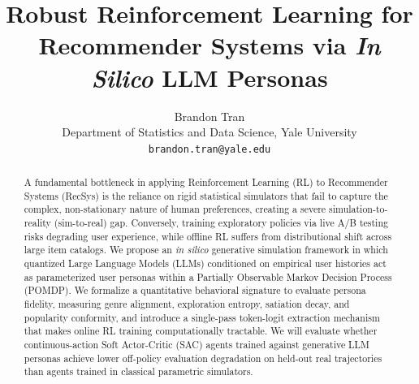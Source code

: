 \documentclass{article}
\title{Robust Reinforcement Learning for Recommender Systems via \textit{In Silico} LLM Personas}
\author{%
  Brandon Tran \\
  Department of Statistics and Data Science, Yale University \\
  \texttt{brandon.tran@yale.edu} \\
}
\begin{document}
\maketitle

\begin{abstract}
A fundamental bottleneck in applying Reinforcement Learning (RL) to Recommender Systems (RecSys) is the reliance on rigid statistical simulators that fail to capture the complex, non-stationary nature of human preferences, creating a severe simulation-to-reality (sim-to-real) gap. Conversely, training exploratory policies via live A/B testing risks degrading user experience, while offline RL suffers from distributional shift across large item catalogs. We propose an \textit{in silico} generative simulation framework in which quantized Large Language Models (LLMs) conditioned on empirical user histories act as parameterized user personas within a Partially Observable Markov Decision Process (POMDP). We formalize a quantitative behavioral signature to evaluate persona fidelity, measuring genre alignment, exploration entropy, satiation decay, and popularity conformity, and introduce a single-pass token-logit extraction mechanism that makes online RL training computationally tractable. We will evaluate whether continuous-action Soft Actor-Critic (SAC) agents trained against generative LLM personas achieve lower off-policy evaluation degradation on held-out real trajectories than agents trained in classical parametric simulators.
\end{abstract}
\end{document}
